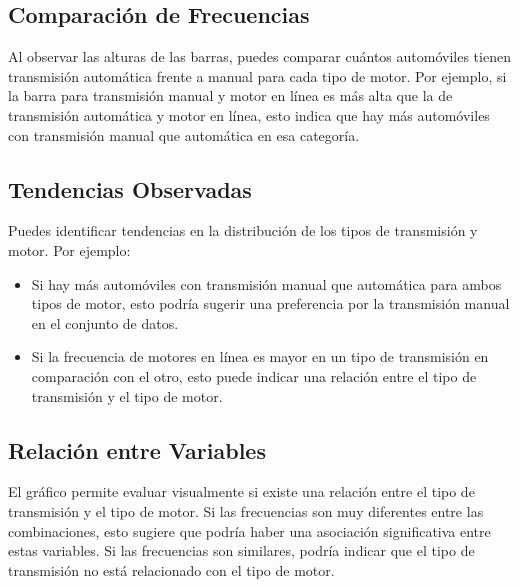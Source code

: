 \documentclass{article}
\begin{document}
\subsection{Comparación de Frecuencias}
Al observar las alturas de las barras, puedes comparar cuántos automóviles tienen transmisión automática frente a manual para cada tipo de motor. Por ejemplo, si la barra para transmisión manual y motor en línea es más alta que la de transmisión automática y motor en línea, esto indica que hay más automóviles con transmisión manual que automática en esa categoría.

\subsection{Tendencias Observadas}
Puedes identificar tendencias en la distribución de los tipos de transmisión y motor. Por ejemplo:
\begin{itemize}
	\item Si hay más automóviles con transmisión manual que automática para ambos tipos de motor, esto podría sugerir una preferencia por la transmisión manual en el conjunto de datos.
	\item Si la frecuencia de motores en línea es mayor en un tipo de transmisión en comparación con el otro, esto puede indicar una relación entre el tipo de transmisión y el tipo de motor.
\end{itemize}

\subsection{Relación entre Variables}
El gráfico permite evaluar visualmente si existe una relación entre el tipo de transmisión y el tipo de motor. Si las frecuencias son muy diferentes entre las combinaciones, esto sugiere que podría haber una asociación significativa entre estas variables. Si las frecuencias son similares, podría indicar que el tipo de transmisión no está relacionado con el tipo de motor.
\end{document}
